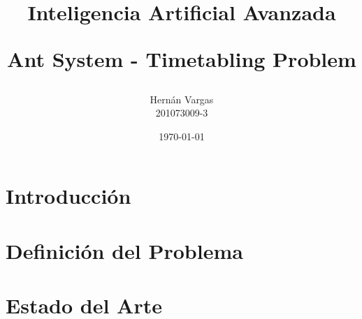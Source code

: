 \documentclass[letter, 10pt]{article}
\begin{document}
\title{
    Inteligencia Artificial Avanzada\\ 
    \begin{Large}
      Ant System - Timetabling Problem
    \end{Large}
}
\author{Hernán Vargas \\ 201073009-3}
\date{\today}
\maketitle

\begin{abstract}
\end{abstract}

\section{Introducción}\label{sec:intro}

\section{Definición del Problema}\label{sec:def}
    
\section{Estado del Arte}\label{sec:art}
\end{document}
